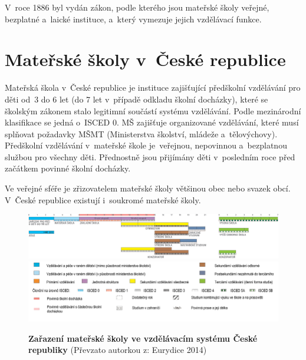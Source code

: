 		V roce 1886 byl vydán zákon, podle kterého jsou mateřské školy veřejné, bezplatné a laické instituce, a~který vymezuje jejich vzdělávací funkce.

	\section{Mateřské školy v~České republice}


		Mateřská škola v České republice je instituce zajišťující předškolní vzdělávání pro děti od 3 do 6 let (do 7 let v případě odkladu školní docházky), které se školským zákonem stalo legitimní součástí systému vzdělávání. Podle mezinárodní klasifikace se jedná o ISCED 0. MŠ zajišťuje organizované vzdělávání, které musí splňovat požadavky MŠMT (Ministerstva školství, mládeže a~tělovýchovy). Předškolní vzdělávání v~mateřské škole je veřejnou, nepovinnou a~bezplatnou službou pro všechny děti. Přednostně jsou přijímány děti v posledním roce před začátkem povinné školní docházky. 
		
		\noindent
		Ve veřejné sféře je zřizovatelem mateřské školy většinou obec nebo svazek obcí. V České republice existují i~soukromé mateřské školy.
		
		\begin{figure} [t]
			\center
			\includegraphics[width=1.0\linewidth]{fotky/msCR.png} \\
			\includegraphics[width=1.0\linewidth]{fotky/msVysvetlivky.png}
			\caption{ \textbf{Zařazení mateřské školy ve vzdělávacím systému České republiky}
			(Převzato autorkou z: Eurydice 2014)
			}
			\label{obr:msCR}
		\end{figure}

